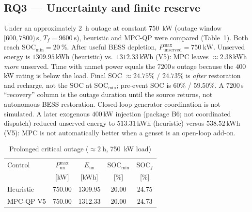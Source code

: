 \documentclass{ieeeaccess}
\begin{document}
\subsection{RQ3 --- Uncertainty and finite reserve}
Under an approximately \SI{2}{\hour} outage at constant \SI{750}{\kilo\watt} (outage window $[600,7800)$\,s, $T_f=\SI{9600}{\second}$), heuristic and MPC-QP were compared (Table~\ref{tab:outage}). Both reach $\mathrm{SOC}_{\min}=\SI{20}{\percent}$. After useful BESS depletion, $P_{\mathrm{unserved}}^{\max}=\SI{750}{\kilo\watt}$. Unserved energy is $1309.95$\,kWh (heuristic) vs.\ $1312.33$\,kWh (V5): MPC leaves $\approx 2.38$\,kWh \emph{more} unserved. Time with unmet power equals the $7200$\,s outage because the $400$\,kW rating is below the load. Final SOC $\approx 24.75\%$ / $24.73\%$ is \emph{after} restoration and recharge, not the SOC at $\mathrm{SOC}_{\min}$; pre-event SOC is $60\%$ / $59.50\%$. A $7200$\,s ``recovery'' column is the outage duration until the source returns, not autonomous BESS restoration. Closed-loop generator coordination is not simulated. A later exogenous $400$\,kW injection (package B6; not coordinated dispatch) reduced unserved energy to $513.31$\,kWh (heuristic) versus $538.52$\,kWh (V5): MPC is not automatically better when a genset is an open-loop add-on.

\begin{table}[!t]
\centering
\caption{Prolonged critical outage ($\approx\SI{2}{\hour}$, \SI{750}{\kilo\watt} load)}
\label{tab:outage}
{\footnotesize\setlength{\tabcolsep}{2.8pt}%
\begin{tabular}{@{}lcccc@{}}
\toprule
Control & $P_{\mathrm{un}}^{\max}$ & $E_{\mathrm{un}}$ & SOC$_{\min}$ & SOC$_f$ \\
 & [kW] & [kWh] & [\%] & [\%] \\
\midrule
Heuristic & 750.00 & 1309.95 & 20.00 & 24.75 \\
MPC-QP V5 & 750.00 & 1312.33 & 20.00 & 24.73 \\
\bottomrule
\end{tabular}}
\end{table}
\end{document}
